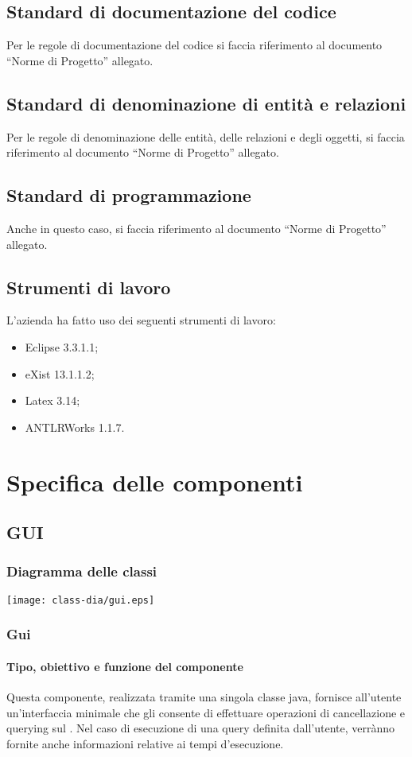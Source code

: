 \section{Standard di documentazione del codice}
Per le regole di documentazione del codice si faccia riferimento al documento ``Norme di Progetto'' allegato.
\section{Standard di denominazione di entit\`a e relazioni}
Per le regole di denominazione delle entit\`a, delle relazioni e degli oggetti, si faccia riferimento al documento ``Norme di Progetto'' allegato.
\section{Standard di programmazione}
Anche in questo caso, si faccia riferimento al documento ``Norme di Progetto'' allegato.
\section{Strumenti di lavoro}
L'azienda ha fatto uso dei seguenti strumenti di lavoro:
\begin{itemize}
\item Eclipse 3.3.1.1;
\item eXist 13.1.1.2; 
\item Latex 3.14;
\item ANTLRWorks 1.1.7.
\end{itemize}
\chapter{Specifica delle componenti}
\section{GUI}
\subsection{Diagramma delle classi}
\begin{center}
\texttt{[image: class-dia/gui.eps]}
\end{center}
\subsection{Gui}
\subsubsection{Tipo, obiettivo e funzione del componente}
Questa componente, realizzata tramite una singola classe java, fornisce all'utente un'interfaccia minimale che gli consente di effettuare operazioni di cancellazione e querying sul \rp. Nel caso di esecuzione di una query definita dall'utente, verr\`anno fornite anche informazioni relative ai tempi d'esecuzione.
